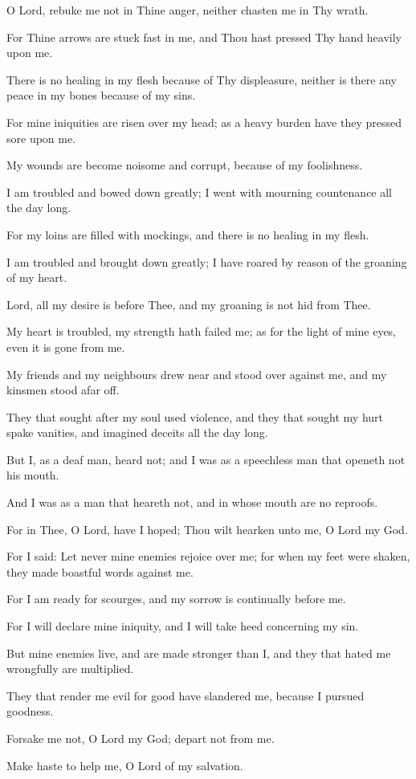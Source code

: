 O Lord, rebuke me not in Thine anger, neither chasten me in Thy wrath.

For Thine arrows are stuck fast in me, and Thou hast pressed Thy hand heavily upon me.

There is no healing in my flesh because of Thy displeasure, neither is there any peace in my bones because of my sins.

For mine iniquities are risen over my head; as a heavy burden have they pressed sore upon me.

My wounds are become noisome and corrupt, because of my foolishness.

I am troubled and bowed down greatly; I went with mourning countenance all the day long.

For my loins are filled with mockings, and there is no healing in my flesh.

I am troubled and brought down greatly; I have roared by reason of the groaning of my heart.

Lord, all my desire is before Thee, and my groaning is not hid from Thee.

My heart is troubled, my strength hath failed me; as for the light of mine eyes, even it is gone from me.

My friends and my neighbours drew near and stood over against me, and my kinsmen stood afar off.

They that sought after my soul used violence, and they that sought my hurt spake vanities, and imagined deceits all the day long.

But I, as a deaf man, heard not; and I was as a speechless man that openeth not his mouth.

And I was as a man that heareth not, and in whose mouth are no reproofs.

For in Thee, O Lord, have I hoped; Thou wilt hearken unto me, O Lord my God.

For I said: Let never mine enemies rejoice over me; for when my feet were shaken, they made boastful words against me.

For I am ready for scourges, and my sorrow is continually before me.

For I will declare mine iniquity, and I will take heed concerning my sin.

But mine enemies live, and are made stronger than I, and they that hated me wrongfully are multiplied.

They that render me evil for good have slandered me, because I pursued goodness.

Forsake me not, O Lord my God; depart not from me.

Make haste to help me, O Lord of my salvation.
